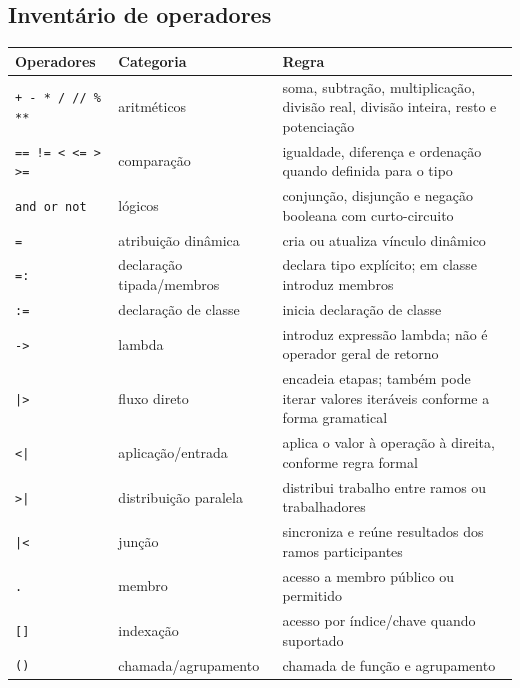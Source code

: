 \documentclass[12pt,a4paper]{article}
\begin{document}
\subsection{Inventário de operadores}
\begin{longtable}{p{3.1cm}p{3.3cm}p{6.8cm}}
\toprule
Operadores & Categoria & Regra\\
\midrule
\texttt{+ - * / // \% **} & aritméticos & soma, subtração, multiplicação, divisão real, divisão inteira, resto e potenciação\\
\texttt{== != < <= > >=} & comparação & igualdade, diferença e ordenação quando definida para o tipo\\
\texttt{and or not} & lógicos & conjunção, disjunção e negação booleana com curto-circuito\\
\texttt{=} & atribuição dinâmica & cria ou atualiza vínculo dinâmico\\
\texttt{=:} & declaração tipada/membros & declara tipo explícito; em classe introduz membros\\
\texttt{:=} & declaração de classe & inicia declaração de classe\\
\texttt{->} & lambda & introduz expressão lambda; não é operador geral de retorno\\
\texttt{|>} & fluxo direto & encadeia etapas; também pode iterar valores iteráveis conforme a forma gramatical\\
\texttt{<|} & aplicação/entrada & aplica o valor à operação à direita, conforme regra formal\\
\texttt{>|} & distribuição paralela & distribui trabalho entre ramos ou trabalhadores\\
\texttt{|<} & junção & sincroniza e reúne resultados dos ramos participantes\\
\texttt{.} & membro & acesso a membro público ou permitido\\
\texttt{[]} & indexação & acesso por índice/chave quando suportado\\
\texttt{()} & chamada/agrupamento & chamada de função e agrupamento\\
\bottomrule
\end{longtable}
\end{document}

